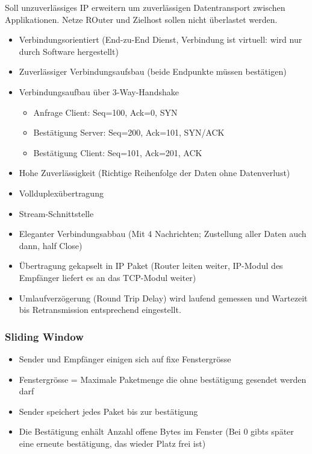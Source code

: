 Soll unzuverlässiges IP erweitern um zuverlässigen Datentransport
zwischen Applikationen. Netze ROuter und Zielhost sollen nicht überlastet
werden.
\begin{itemize}
\item Verbindungsorientiert (End-zu-End Dienst, Verbindung ist virtuell:
wird nur durch Software hergestellt) 
\item Zuverlässiger Verbindungsaufsbau (beide Endpunkte müssen bestätigen)
\item Verbindungsaufbau über 3-Way-Handshake

\begin{itemize}
\item Anfrage Client: Seq=100, Ack=0, SYN
\item Bestätigung Server: Seq=200, Ack=101, SYN/ACK
\item Bestätigung Client: Seq=101, Ack=201, ACK
\end{itemize}
\item Hohe Zuverlässigkeit (Richtige Reihenfolge der Daten ohne Datenverlust)
\item Vollduplexübertragung
\item Stream-Schnittstelle
\item Eleganter Verbindungsabbau (Mit 4 Nachrichten; Zustellung aller Daten
auch dann, half Close)
\item Übertragung gekapselt in IP Paket (Router leiten weiter, IP-Modul
des Empfänger liefert es an das TCP-Modul weiter)
\item Umlaufverzögerung (Round Trip Delay) wird laufend gemessen und Wartezeit
bis Retransmission entsprechend eingestellt.
\end{itemize}

\subsubsection*{Sliding Window}
\begin{itemize}
\item Sender und Empfänger einigen sich auf fixe Fenstergrösse
\item Fenstergrösse = Maximale Paketmenge die ohne bestätigung gesendet
werden darf
\item Sender speichert jedes Paket bis zur bestätigung
\item Die Bestätigung enhält Anzahl offene Bytes im Fenster (Bei 0 gibts
später eine erneute bestätigung, das wieder Platz frei ist)
\end{itemize}

